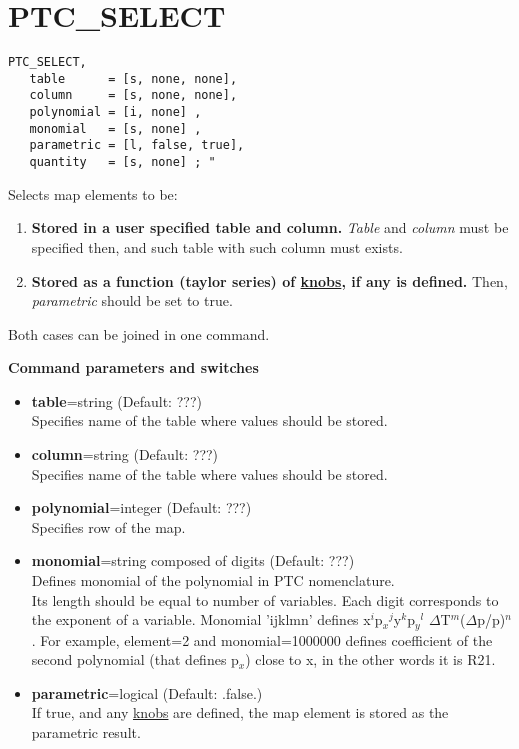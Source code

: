 
\section{PTC\_SELECT}

\begin{verbatim}
PTC_SELECT, 
   table      = [s, none, none], 
   column     = [s, none, none], 
   polynomial = [i, none] , 
   monomial   = [s, none] , 
   parametric = [l, false, true], 
   quantity   = [s, none] ; "
\end{verbatim}


Selects map elements to be: 
\begin{enumerate}
  \item {\bf Stored in a user specified table and column.}
    \textit{Table} and \textit{column} must be specified then, and such
    table with such column must exists.  

  \item {\bf Stored as a function (taylor series) of
    \href{PTC_Knob.html}{knobs}, if any is defined.} Then,
    \textit{parametric} should be set to true. 
\end{enumerate}
Both cases can be joined in one command.   


{\bf Command parameters and switches}

\begin{itemize}
   \item {\bf table}=string (Default: ???)\\
     Specifies name of the table where values should be stored.   
   \item {\bf column}=string (Default: ???)\\     
     Specifies name of the table where values should be stored.   
   \item {\bf polynomial}=integer (Default: ???)\\
     Specifies row of the map.   
   \item {\bf monomial}=string composed of digits (Default: ???)\\
     Defines monomial of the polynomial in PTC nomenclature. \\
     Its length should be equal to number of variables. Each digit
     corresponds to the exponent of a variable. Monomial 'ijklmn'
     defines x$^i$p$_x$$^j$y$^k$p$_y$$^l$
     $\Delta$T$^m$($\Delta$p/p)$^n$. For example, element=2 and
     monomial=1000000 defines coefficient of the second polynomial (that
     defines p$_x$) close to x, in the other words it is R21.  
   \item{\bf parametric}=logical (Default: .false.)\\
     If true, and any \href{PTC_Knob.html}{knobs} are defined, the
     map element is stored as the parametric result.            
\end{itemize}


